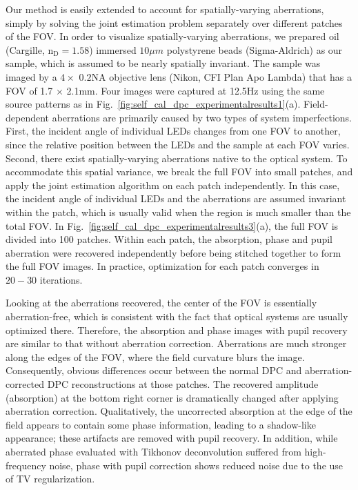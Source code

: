 Our method is easily extended to account for spatially-varying aberrations, simply by solving the joint estimation problem separately over different patches of the FOV. In order to visualize spatially-varying aberrations, we prepared oil (Cargille, $\mathrm{n}_{\mathrm{D}}=1.58$) immersed $10\mu m$ polystyrene beads (Sigma-Aldrich) as our sample, which is assumed to be nearly spatially invariant. The sample was imaged by a $4\times$ $0.2 \mathrm{NA}$ objective lens (Nikon, CFI Plan Apo Lambda) that has a FOV of 1.7 $\times$ 2.1mm. Four images were captured at 12.5Hz using the same source patterns as in Fig.~\ref{fig:self_cal_dpc_experimentalresults1}(a). Field-dependent aberrations are primarily caused by two types of system imperfections. First, the incident angle of individual LEDs changes from one FOV to another, since the relative position between the LEDs and the sample at each FOV varies. Second, there exist spatially-varying aberrations native to the optical system. To accommodate this spatial variance, we break the full FOV into small patches, and apply the joint estimation algorithm on each patch independently. In this case, the incident angle of individual LEDs and the aberrations are assumed invariant within the patch, which is usually valid when the region is much smaller than the total FOV. In Fig.~\ref{fig:self_cal_dpc_experimentalresults3}(a), the full FOV is divided into 100 patches. Within each patch, the absorption, phase and pupil aberration were recovered independently before being stitched together to form the full FOV images. In practice, optimization for each patch converges in $20-30$ iterations.

Looking at the aberrations recovered, the center of the FOV is essentially aberration-free, which is consistent with the fact that optical systems are usually optimized there. Therefore, the absorption and phase images with pupil recovery are similar to that without aberration correction. Aberrations are much stronger along the edges of the FOV, where the field curvature blurs the image. Consequently, obvious differences occur between the normal DPC and aberration-corrected DPC reconstructions at those patches. The recovered amplitude (absorption) at the bottom right corner is dramatically changed after applying aberration correction. Qualitatively, the uncorrected absorption at the edge of the field appears to contain some phase information, leading to a shadow-like appearance; these artifacts are removed with pupil recovery. In addition, while aberrated phase evaluated with Tikhonov deconvolution suffered from high-frequency noise, phase with pupil correction shows reduced noise due to the use of TV regularization.

